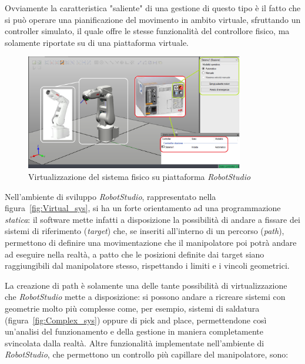 Ovviamente la caratteristica "saliente" di una gestione di questo tipo è il fatto che si può operare una pianificazione del movimento in ambito virtuale, sfruttando un controller simulato, il quale offre le stesse funzionalità del controllore fisico, ma solamente riportate su di una piattaforma virtuale.
\begin{figure}[h]
	\centering
	\includegraphics[width=0.85\textwidth]{Immagini/Virtual_System}
	\caption{Virtualizzazione del sistema fisico su piattaforma \emph{RobotStudio}}
	\label{fig:Virtual_sys}
\end{figure}

Nell'ambiente di sviluppo \emph{RobotStudio}, rappresentato nella figura~\vref{fig:Virtual_sys}, si ha un forte orientamento ad una programmazione \emph{statica}: il software mette infatti a disposizione la possibilità di andare a fissare dei sistemi di riferimento (\emph{target}) che, se inseriti all'interno di un percorso (\emph{path}), permettono di definire una movimentazione che il manipolatore poi potrà andare ad eseguire nella realtà, a patto che le posizioni definite dai target siano raggiungibili dal manipolatore stesso, rispettando i limiti e i vincoli geometrici.

La creazione di path è solamente una delle tante possibilità di virtualizzazione che \emph{RobotStudio} mette a disposizione: si possono andare a ricreare sistemi con geometrie molto più complesse come, per esempio, sistemi di saldatura (figura~\vref{fig:Complex_sys}) oppure di pick and place, permettendone così un'analisi del funzionamento e della gestione in maniera completamente svincolata dalla realtà.
Altre funzionalità implementate nell'ambiente di \emph{RobotStudio}, che permettono un controllo più capillare del manipolatore, sono:

